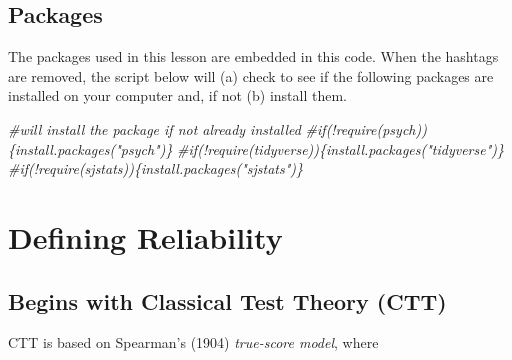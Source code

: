 \documentclass[
  english,
]{book}
\newenvironment{Shaded}{\begin{snugshade}}{\end{snugshade}}
\newcommand{\CommentTok}[1]{\textcolor[rgb]{0.56,0.35,0.01}{\textit{#1}}}
\begin{document}
\hypertarget{packages-2}{%
\subsection{Packages}\label{packages-2}}

The packages used in this lesson are embedded in this code. When the hashtags are removed, the script below will (a) check to see if the following packages are installed on your computer and, if not (b) install them.

\begin{Shaded}
\begin{Highlighting}[]
\CommentTok{\#will install the package if not already installed}
\CommentTok{\#if(!require(psych))\{install.packages("psych")\}}
\CommentTok{\#if(!require(tidyverse))\{install.packages("tidyverse")\}}
\CommentTok{\#if(!require(sjstats))\{install.packages("sjstats")\}}
\end{Highlighting}
\end{Shaded}

\hypertarget{defining-reliability}{%
\section{Defining Reliability}\label{defining-reliability}}

\hypertarget{begins-with-classical-test-theory-ctt}{%
\subsection{Begins with Classical Test Theory (CTT)}\label{begins-with-classical-test-theory-ctt}}

CTT is based on Spearman's (1904) \emph{true-score model}, where
\end{document}
